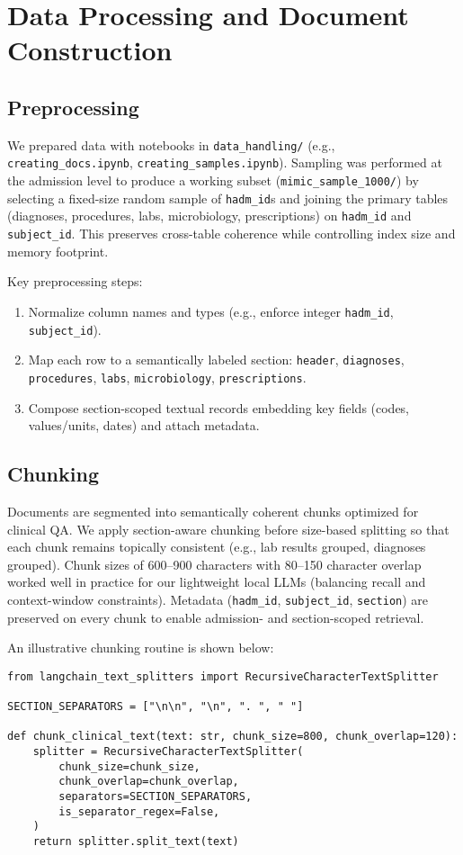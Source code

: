 \section{Data Processing and Document Construction}
\subsection{Preprocessing}
We prepared data with notebooks in \texttt{data\_handling/} (e.g., \texttt{creating\_docs.ipynb}, \texttt{creating\_samples.ipynb}). Sampling was performed at the admission level to produce a working subset (\texttt{mimic\_sample\_1000/}) by selecting a fixed-size random sample of \texttt{hadm\_id}s and joining the primary tables (diagnoses, procedures, labs, microbiology, prescriptions) on \texttt{hadm\_id} and \texttt{subject\_id}. This preserves cross-table coherence while controlling index size and memory footprint.

Key preprocessing steps:
\begin{enumerate}
  \item Normalize column names and types (e.g., enforce integer \texttt{hadm\_id}, \texttt{subject\_id}).
  \item Map each row to a semantically labeled section: \texttt{header}, \texttt{diagnoses}, \texttt{procedures}, \texttt{labs}, \texttt{microbiology}, \texttt{prescriptions}.
  \item Compose section-scoped textual records embedding key fields (codes, values/units, dates) and attach metadata.
\end{enumerate}

\subsection{Chunking}
Documents are segmented into semantically coherent chunks optimized for clinical QA. We apply section-aware chunking before size-based splitting so that each chunk remains topically consistent (e.g., lab results grouped, diagnoses grouped). Chunk sizes of 600--900 characters with 80--150 character overlap worked well in practice for our lightweight local LLMs (balancing recall and context-window constraints). Metadata (\texttt{hadm\_id}, \texttt{subject\_id}, \texttt{section}) are preserved on every chunk to enable admission- and section-scoped retrieval.

An illustrative chunking routine is shown below:

\begin{verbatim}
from langchain_text_splitters import RecursiveCharacterTextSplitter

SECTION_SEPARATORS = ["\n\n", "\n", ". ", " "]

def chunk_clinical_text(text: str, chunk_size=800, chunk_overlap=120):
    splitter = RecursiveCharacterTextSplitter(
        chunk_size=chunk_size,
        chunk_overlap=chunk_overlap,
        separators=SECTION_SEPARATORS,
        is_separator_regex=False,
    )
    return splitter.split_text(text)
\end{verbatim}

